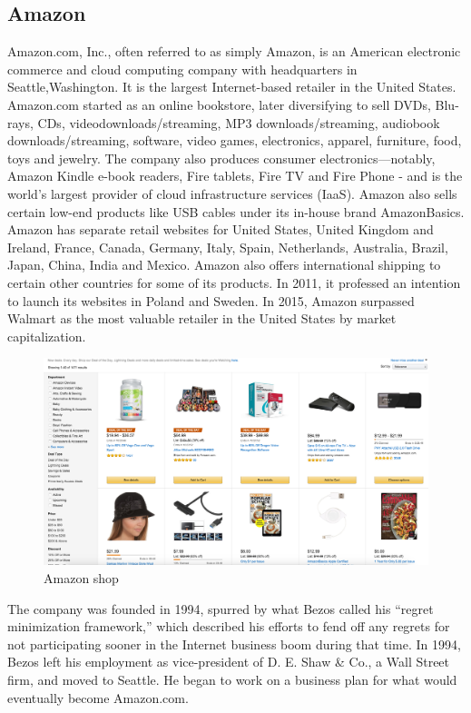 \subsection{Amazon}
Amazon.com, Inc., often referred to as simply Amazon, is an American electronic commerce and cloud computing company with headquarters in Seattle,Washington. It is the largest Internet-based retailer in the United States. Amazon.com started as an online bookstore, later diversifying to sell DVDs, Blu-rays, CDs, videodownloads/streaming, MP3 downloads/streaming, audiobook downloads/streaming, software, video games, electronics, apparel, furniture, food, toys and jewelry. The company also produces consumer electronics—notably, Amazon Kindle e-book readers, Fire tablets, Fire TV and Fire Phone - and is the world's largest provider of cloud infrastructure services (IaaS). Amazon also sells certain low-end products like USB cables under its in-house brand AmazonBasics.
\newline
Amazon has separate retail websites for United States, United Kingdom and Ireland, France, Canada, Germany, Italy, Spain, Netherlands, Australia, Brazil, Japan, China, India and Mexico.
\newline
Amazon also offers international shipping to certain other countries for some of its products. In 2011, it professed an intention to launch its websites in Poland and Sweden.
In 2015, Amazon surpassed Walmart as the most valuable retailer in the United States by market capitalization.
\begin{figure}[htb]
 \centering
 \includegraphics[width=1.0\linewidth]{images/chapter1/ex-amazon.png}\hfill
 \caption[Amazon shop]{Amazon shop}
 \label{fig:e_commerce_amazon_shop}
\end{figure}
The company was founded in 1994, spurred by what Bezos called his “regret minimization framework,” which described his efforts to fend off any regrets for not participating sooner in the Internet business boom during that time. In 1994, Bezos left his employment as vice-president of D. E. Shaw \& Co., a Wall Street firm, and moved to Seattle. He began to work on a business plan for what would eventually become Amazon.com.
